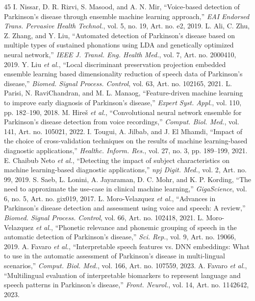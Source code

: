 \documentclass[journal,10pt,twoside]{IEEEtran}
\begin{document}
\begin{thebibliography}{45}
 I. Nissar, D. R. Rizvi, S. Masood, and A. N. Mir, ``Voice-based detection of Parkinson's disease through ensemble machine learning approach,'' \textit{EAI Endorsed Trans. Pervasive Health Technol.}, vol. 5, no. 19, Art. no. e2, 2019.
 L. Ali, C. Zhu, Z. Zhang, and Y. Liu, ``Automated detection of Parkinson's disease based on multiple types of sustained phonations using LDA and genetically optimized neural network,'' \textit{IEEE J. Transl. Eng. Health Med.}, vol. 7, Art. no. 2000410, 2019.
 Y. Liu \textit{et al.}, ``Local discriminant preservation projection embedded ensemble learning based dimensionality reduction of speech data of Parkinson's disease,'' \textit{Biomed. Signal Process. Control}, vol. 63, Art. no. 102165, 2021.
 L. Parisi, N. RaviChandran, and M. L. Manaog, ``Feature-driven machine learning to improve early diagnosis of Parkinson's disease,'' \textit{Expert Syst. Appl.}, vol. 110, pp. 182--190, 2018.
 M. Hire\v{s} \textit{et al.}, ``Convolutional neural network ensemble for Parkinson's disease detection from voice recordings,'' \textit{Comput. Biol. Med.}, vol. 141, Art. no. 105021, 2022.
 I. Tougui, A. Jilbab, and J. El Mhamdi, ``Impact of the choice of cross-validation techniques on the results of machine learning-based diagnostic applications,'' \textit{Healthc. Inform. Res.}, vol. 27, no. 3, pp. 189--199, 2021.
 E. Chaibub Neto \textit{et al.}, ``Detecting the impact of subject characteristics on machine learning-based diagnostic applications,'' \textit{npj Digit. Med.}, vol. 2, Art. no. 99, 2019.
 S. Saeb, L. Lonini, A. Jayaraman, D. C. Mohr, and K. P. Kording, ``The need to approximate the use-case in clinical machine learning,'' \textit{GigaScience}, vol. 6, no. 5, Art. no. gix019, 2017.
 L. Moro-Velazquez \textit{et al.}, ``Advances in Parkinson's disease detection and assessment using voice and speech: A review,'' \textit{Biomed. Signal Process. Control}, vol. 66, Art. no. 102418, 2021.
 L. Moro-Velazquez \textit{et al.}, ``Phonetic relevance and phonemic grouping of speech in the automatic detection of Parkinson's disease,'' \textit{Sci. Rep.}, vol. 9, Art. no. 19066, 2019.
 A. Favaro \textit{et al.}, ``Interpretable speech features vs. DNN embeddings: What to use in the automatic assessment of Parkinson's disease in multi-lingual scenarios,'' \textit{Comput. Biol. Med.}, vol. 166, Art. no. 107559, 2023.
 A. Favaro \textit{et al.}, ``Multilingual evaluation of interpretable biomarkers to represent language and speech patterns in Parkinson's disease,'' \textit{Front. Neurol.}, vol. 14, Art. no. 1142642, 2023.

\end{thebibliography}
\end{document}
